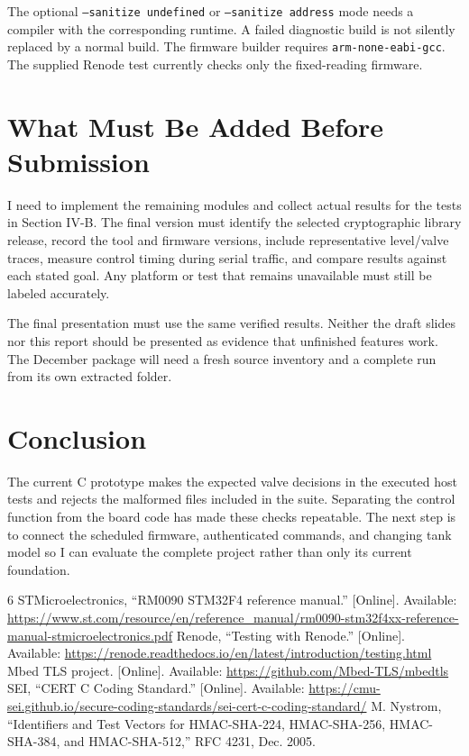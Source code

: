 \documentclass[conference]{IEEEtran}
\begin{document}
The optional \texttt{--sanitize undefined} or \texttt{--sanitize address} mode needs a compiler with the corresponding runtime. A failed diagnostic build is not silently replaced by a normal build. The firmware builder requires \texttt{arm-none-eabi-gcc}. The supplied Renode test currently checks only the fixed-reading firmware.

\section{What Must Be Added Before Submission}
I need to implement the remaining modules and collect actual results for the tests in Section IV-B. The final version must identify the selected cryptographic library release, record the tool and firmware versions, include representative level/valve traces, measure control timing during serial traffic, and compare results against each stated goal. Any platform or test that remains unavailable must still be labeled accurately.

The final presentation must use the same verified results. Neither the draft slides nor this report should be presented as evidence that unfinished features work. The December package will need a fresh source inventory and a complete run from its own extracted folder.

\section{Conclusion}
The current C prototype makes the expected valve decisions in the executed host tests and rejects the malformed files included in the suite. Separating the control function from the board code has made these checks repeatable. The next step is to connect the scheduled firmware, authenticated commands, and changing tank model so I can evaluate the complete project rather than only its current foundation.

\begin{thebibliography}{6}
 STMicroelectronics, ``RM0090 STM32F4 reference manual.'' [Online]. Available: \url{https://www.st.com/resource/en/reference_manual/rm0090-stm32f4xx-reference-manual-stmicroelectronics.pdf}
 Renode, ``Testing with Renode.'' [Online]. Available: \url{https://renode.readthedocs.io/en/latest/introduction/testing.html}
 Mbed TLS project. [Online]. Available: \url{https://github.com/Mbed-TLS/mbedtls}
 SEI, ``CERT C Coding Standard.'' [Online]. Available: \url{https://cmu-sei.github.io/secure-coding-standards/sei-cert-c-coding-standard/}
 M. Nystrom, ``Identifiers and Test Vectors for HMAC-SHA-224, HMAC-SHA-256, HMAC-SHA-384, and HMAC-SHA-512,'' RFC 4231, Dec. 2005.
\end{thebibliography}
\end{document}
